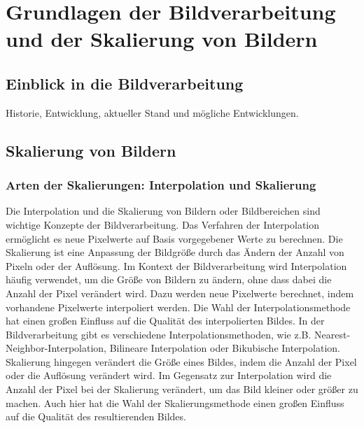 



\chapter{Grundlagen der Bildverarbeitung und der Skalierung von Bildern}


\section{Einblick in die Bildverarbeitung}
Historie, Entwicklung, aktueller Stand und mögliche Entwicklungen.

\section{Skalierung von Bildern}

\subsection{Arten der Skalierungen: Interpolation und Skalierung}
    Die Interpolation und die Skalierung von Bildern oder Bildbereichen sind wichtige Konzepte der Bildverarbeitung. 
    Das Verfahren der Interpolation ermöglicht es neue Pixelwerte auf Basis vorgegebener Werte zu berechnen.
    Die Skalierung ist eine Anpassung der Bildgröße durch das Ändern der Anzahl von Pixeln oder der Auflösung.
    Im Kontext der Bildverarbeitung wird Interpolation häufig verwendet, um die Größe von Bildern zu ändern, ohne dass dabei die Anzahl der Pixel verändert wird. Dazu werden neue Pixelwerte berechnet, indem vorhandene Pixelwerte interpoliert werden. 
    Die Wahl der Interpolationsmethode hat einen großen Einfluss auf die Qualität des interpolierten Bildes. 
    In der Bildverarbeitung gibt es verschiedene Interpolationsmethoden, wie z.B. Nearest-Neighbor-Interpolation, Bilineare Interpolation oder Bikubische Interpolation.
    Skalierung hingegen verändert die Größe eines Bildes, indem die Anzahl der Pixel oder die Auflösung verändert wird. 
    Im Gegensatz zur Interpolation wird die Anzahl der Pixel bei der Skalierung verändert, um das Bild kleiner oder größer zu machen. 
    Auch hier hat die Wahl der Skalierungsmethode einen großen Einfluss auf die Qualität des resultierenden Bildes.

